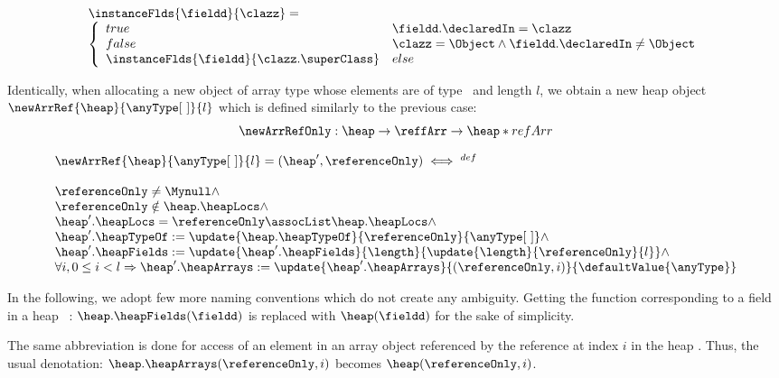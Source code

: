 $$
 \begin{array}{l}
       \instanceFlds{\fieldd}{\clazz } = \\
       \left\{\begin{array}{ll}
                    true  & \fieldd.\declaredIn = \clazz \\
		    false & \clazz = \Object \wedge \fieldd.\declaredIn \neq \Object \\
		    \instanceFlds{\fieldd}{\clazz.\superClass} & else
       \end{array}\right.
 \end{array}
$$


Identically, when allocating a new object of array type whose elements are of type \anyType \ and length $l$, we obtain 
a new heap object  $\newArrRef{\heap}{\anyType \lbrack \ \rbrack  }{l} $ which is defined similarly to the previous case: 
$$ \newArrRefOnly :  \heap \rightarrow  \reffArr \rightarrow  \heap * refArr $$

 $$  \begin{array}{l}
            \newArrRef{\heap}{\anyType\lbrack \ \rbrack}{l} = (\heap', \referenceOnly)      \iff^{def} \\
	    \\
	    \referenceOnly \neq \Mynull \wedge \\ 
	    \referenceOnly \notin \heap.\heapLocs \wedge   \\ 
	    \heap'.\heapLocs = \referenceOnly \assocList \heap.\heapLocs \wedge \\ 
	    \heap'.\heapTypeOf :=  \update{ \heap.\heapTypeOf}{ \referenceOnly}{\anyType\lbrack \ \rbrack  }  \wedge \\ 
            \heap'.\heapFields :=  \update{\heap'.\heapFields}{\length}{\update{\length}{ \referenceOnly}{ l }} \wedge  \\
	    \forall i, 0 \le i < l  \Rightarrow   \heap'.\heapArrays :=
            \update{\heap'.\heapArrays}{(\referenceOnly , i)}{ \defaultValue{\anyType }  } \\
	     
     \end{array} $$



In the following, we adopt few more naming conventions which do not create any ambiguity.
 Getting the function corresponding to a field \fieldd in a heap \heap \ :
$ \heap . \heapFields ( \fieldd)$ is replaced  with $ \heap  ( \fieldd)$ for the sake of simplicity.
 
The same abbreviation is done for access of an element in an  array object referenced by the reference 
  at index $i$ in the heap \heap. Thus, the usual denotation:
$ \heap . \heapArrays (\referenceOnly, i )$ becomes $ \heap(\referenceOnly, i )$.
 
